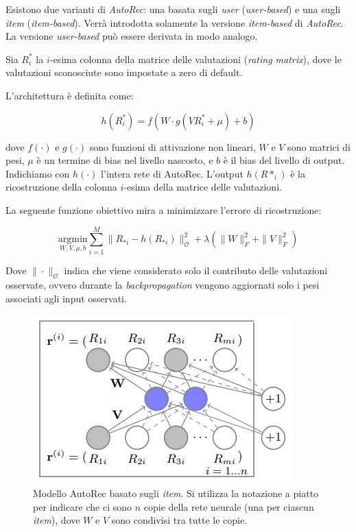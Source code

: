 Esistono due varianti di \textit{AutoRec}: una basata sugli \textit{user} (\textit{user-based}) e una sugli \textit{item} (\textit{item-based}). Verrà introdotta solamente la versione \textit{item-based} di \textit{AutoRec}. La versione \textit{user-based} può essere derivata in modo analogo.


Sia $R^*_i$ la $i$-esima colonna della matrice delle valutazioni (\textit{rating matrix}), dove le valutazioni sconosciute sono impostate a zero di default.

L'architettura è definita come:

\[
h(R^*_i) = f\left( W \cdot g\left( VR^*_i + \mu \right) + b \right)
\]

dove $f(\cdot)$ e $g(\cdot)$ sono funzioni di attivazione non lineari, $W$ e $V$ sono matrici di pesi, $\mu$ è un termine di bias nel livello nascosto, e $b$ è il bias del livello di output. Indichiamo con $h(\cdot)$ l'intera rete di AutoRec. L'output $h(R*_{i})$ è la ricostruzione della colonna $i$-esima della matrice delle valutazioni.

La seguente funzione obiettivo mira a minimizzare l'errore di ricostruzione:

\[
\underset{W, V, \mu, b}{\mathrm{argmin}} \sum_{i=1}^M{\parallel R_{*i} - h(R_{*i}) \parallel_{\mathcal{O}}^2} + \lambda(\| W \|_F^2 + \| V \|_F^2)
\]

Dove $ \| \cdot \|_{\mathcal{O}}$ indica che viene considerato solo il contributo delle valutazioni osservate, ovvero durante la \textit{backpropagation} vengono aggiornati solo i pesi associati agli input osservati.

\begin{figure}[H]
    \centering
    \includegraphics[keepaspectratio]{figures/algorithms/auto_rc.PNG}
    \caption{Modello AutoRec basato sugli \textit{item}. Si utilizza la notazione a piatto per indicare che ci sono $n$ copie della rete neurale (una per ciascun \textit{item}), dove $W$ e $V$ sono condivisi tra tutte le copie.}
    \label{fig:auto_rec}
\end{figure}

